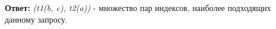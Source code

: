 \textbf{Ответ:} \textit{(t1(b, c), t2(a))} - множество пар индексов, наиболее подходящих данному запросу.











